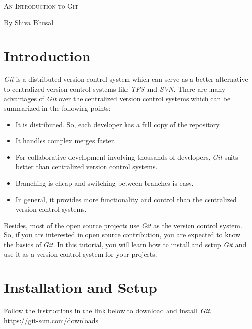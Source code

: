 \documentclass[letterpaper]{article}
\newcommand{\reporttitle}{An Introduction to Git}
\newcommand{\name}{By Shiva Bhusal}
\newcommand{\course}{}
\begin{document}
\begin{center}{\huge \scshape \reporttitle}\end{center}
\begin{center}\vspace{0.2em} {\Large \name\\}
  {\course}\end{center} 
  
\tableofcontents
  
\section{Introduction}
\textit{Git} is a distributed version control system which can serve as a better alternative to centralized version control systems like \textit{TFS} and \textit{SVN}. There are many advantages of \textit{Git} over the centralized version control systems which can be summarized in the following points:
\begin{itemize}
    \item It is distributed. So, each developer has a full copy of the repository.
    \item It handles complex merges faster.
    \item For collaborative development involving thousands of developers, \textit{Git} suits better than centralized version control systems.
    \item Branching is cheap and switching between branches is easy.
    \item In general, it provides more functionality and control than the centralized version control systems.
\end{itemize}

Besides, most of the open source projects use \textit{Git} as the version control system. So, if you are interested in open source contribution, you are expected to know the basics of \textit{Git}. In this tutorial, you will learn how to install and setup \textit{Git} and use it as a version control system for your projects. 

\section{Installation and Setup}
    Follow the instructions in the link below to download and install \textit{Git}.\\

\url{https://git-scm.com/downloads}
\\
\end{document}
